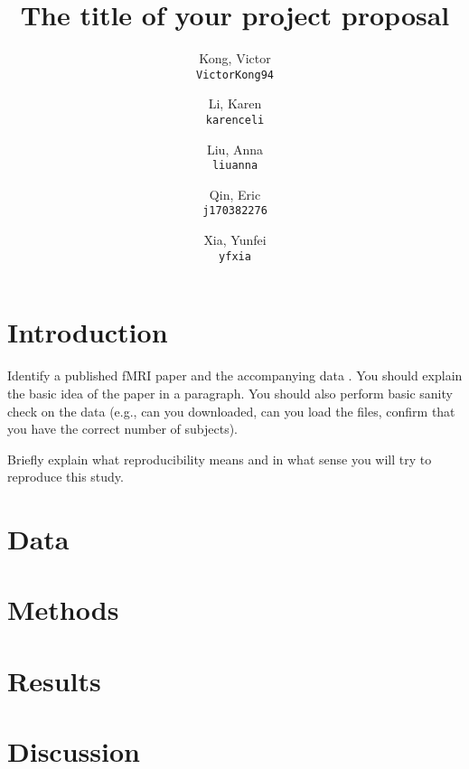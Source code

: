 \documentclass[11pt]{article}
\title{The title of your project proposal}
\author{
  Kong, Victor\\
  \texttt{VictorKong94}
  \and
  Li, Karen\\
  \texttt{karenceli}
  \and
  Liu, Anna\\
  \texttt{liuanna}
  \and
  Qin, Eric\\
  \texttt{j170382276}
  \and
  Xia, Yunfei\\
  \texttt{yfxia}
}
\begin{document}
\maketitle


\section{Introduction}

Identify a published fMRI paper and the accompanying data
\cite{lindquist2008statistical}.  You should explain the basic idea of the
paper in a paragraph.  You should also perform basic sanity check on the data
(e.g., can you downloaded, can you load the files, confirm that you have the
correct number of subjects).

Briefly explain what reproducibility means and in what sense you will
try to reproduce this study.

\section{Data}

\section{Methods}
\section{Results}
\section{Discussion}



\end{document}
